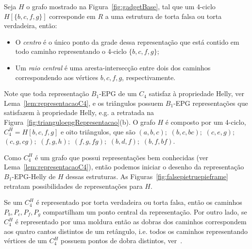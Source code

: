 
\begin{definition}
Seja $H$ o grafo mostrado na  Figura~\ref{fig:gadgetBase}, tal que um 4-ciclo $H[\{b, c, f, g \}]$ corresponde em $R$ a uma estrutura de torta falsa ou torta verdadeira, então:

\begin{itemize}
\item O \emph{centro} é o único ponto da grade dessa representação que está contido em todo caminho representando o 4-ciclo $ \{b, c, f, g \}$; \label{lab:lab1}

\item Um \emph {raio central} é uma aresta-intersecção entre dois dos caminhos correspondendo aos vértices $ b, c, f, g$, respectivamente.
\end{itemize}
\end{definition}


Note que toda representação $B_1$-EPG de um $C_4$ satisfaz à propriedade Helly, ver Lema~\ref{lem:representacaoC4}, e os triângulos possuem $B_1$-EPG representações que satisfazem à propriedade Helly, e.g. a retratada na Figura~\ref{fig:trianguloepgRepresentacao}(b). O grafo $H$ é composto por um 4-ciclo,  $C_4^{H}=H[b, c, f, g]$ e oito triângulos, que são $(a,b,c);$ $(b,c,bc);$ $(c,e,g);$ $(c,g,cg);$ $(f,g,h);$ $(f,g,fg);$ $(b,d,f);$ $(b,f,bf).$

Como $C_4^{H}$ é um grafo que possui representações bem conhecidas (ver Lema~\ref{lem:representacaoC4}), então podemos iniciar o desenho da representação $B_{1}$-EPG-Helly de $H$ dessas estruturas. As  Figuras~\ref{fig:falsepietruepieframe} retratam possibilidades de representações para $H$.

Se um $C_4^{H}$ é representado por torta verdadeira ou torta falsa, então os caminhos $P_b, P_c, P_f, P_g$ compartilham um ponto central da representação. Por outro lado, se  $C_4^{H}$ é representado por uma moldura então as dobras dos caminhos correspondem aos quatro cantos distintos de um retângulo, i.e. todos os caminhos representando  vértices de um $C_4^{H}$ possuem pontos de dobra distintos, ver~\cite{golumbic2009}.

